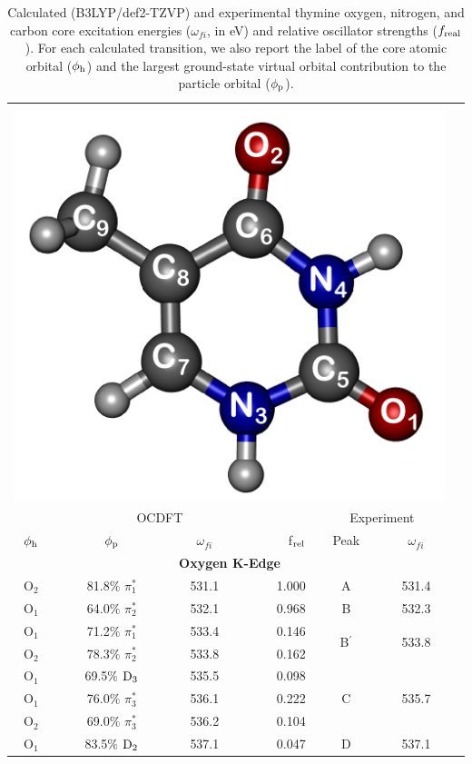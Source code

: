 \documentclass[12pt]{article}
\begin{document}
   \begin{table}[!t]
   \footnotesize
            \caption{Calculated (B3LYP/def2-TZVP) and experimental thymine oxygen, nitrogen, and carbon core excitation energies ($\omega_{fi}$, in eV) and relative oscillator strengths ($f_{\rm real}$).  For each calculated transition, we also report the label of the core atomic orbital ($\phi_{\rm h}$) and the  largest ground-state virtual orbital contribution to the particle orbital ($\phi_{\rm p}$).}
 \centering
     \begin{tabular*}{8.5cm}{@{\extracolsep{\fill} }cccrccc}
     \hline
     \hline\\[-8pt]
     \multicolumn{6}{c}{
 \includegraphics[width=3.cm]{ThymineNumbering.png}
 }\\
 \hline
   \multicolumn{4}{c}{OCDFT} &\multicolumn{2}{c}{Experiment} \\
 $\phi_{\rm h}$ &  $\phi_{\rm p}$ & $\omega_{fi}$ & f$_{\rm rel}$ & Peak &  $\omega_{fi}$   \\[1pt]
   \hline
    \multicolumn{6}{c}{\textbf{Oxygen K-Edge}} \vspace{0.05in}\\
    O$_2$
 &   81.8$\%$ $\pi_1^*$  & 531.1 & 1.000 & A  & 531.4 \vspace{0.05in}\\
    O$_1$
 &   64.0$\%$ $\pi_2^*$  & 532.1 & 0.968 & B & 532.3 \vspace{0.05in}\\
    O$_1$
 &   71.2$\%$ $\pi_1^*$  & 533.4 & 0.146 & \multirow{2}{*}{B$^{\prime}$} & \multirow{2}{*}{533.8}  \\ %
    O$_2$
 &   78.3$\%$ $\pi_2^*$  & 533.8 & 0.162 \vspace{0.05in}\\
    O$_1$
 &   69.5$\%$ $\rm D_3$  & 535.5 & 0.098   & \multirow{3}{*}{C} & \multirow{3}{*}{535.7}  \\
    O$_1$
 &   76.0$\%$ $\pi_3^*$  & 536.1 & 0.222 \\
    O$_2$
 &   69.0$\%$ $\pi_3^*$  & 536.2 & 0.104 \vspace{0.05in}\\
    O$_1$
 &   83.5$\%$ $\rm D_2$  & 537.1 & 0.047 & \multirow{3}{*}{D} & \multirow{3}{*}{537.1} \\

\end{tabular*}
\end{table}
\end{document}
